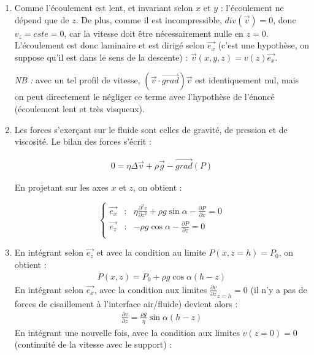 \begin{correction}

\begin{enumerate}

	\item Comme l'écoulement est lent, et invariant selon $x$ et $y$ : l'écoulement ne dépend que de $z$. De plus, comme il est incompressible, $div(\vec{v})=0$, donc $v_z=cste=0$, car la vitesse doit être nécessairement nulle en $z=0$. L'écoulement est donc laminaire et est dirigé selon $\vec{e_x}$ (c'est une hypothèse, on suppose qu'il est dans le sens de la descente) : $\vec{v}(x,y,z)=v(z)\vec{e_x}$.
	
	\textit{NB : }avec un tel profil de vitesse, $(\vec{v}\cdot\vec{grad})\vec{v}$ est identiquement nul, mais on peut directement le négliger ce terme avec l'hypothèse de l'énoncé (écoulement lent et très visqueux).
	
	\item Les forces s'exerçant sur le fluide sont celles de gravité, de pression et de viscosité. Le bilan des forces s'écrit : 

\begin{align*}
	0=\eta \Delta \vec{v}+\rho\vec{g}-\vec{grad}(P)
\end{align*}

	En projetant sur les axes $x$ et $z$, on obtient :
	
\begin{equation}
\left\lbrace
\begin{array}{ccc}
\vec{e_x}  & : & \eta\frac{\partial^2 v}{\partial z^2}+\rho g \sin\alpha - \frac{\partial P}{\partial x}=0\\
\vec{e_z}  & : &-\rho g \cos\alpha - \frac{\partial P}{\partial z}=0\\
\end{array}\right.
\end{equation}	

	\item En intégrant selon $\vec{e_z}$ et avec la condition au limite $P(x,z=h)=P_0$, on obtient :
\begin{align*}
	P(x,z)=P_0+\rho g\cos\alpha (h-z)
\end{align*}
En intégrant selon $\vec{e_x}$, avec la condition aux limites $\frac{\partial v}{\partial z}_{z=h}=0$ (il n'y a pas de forces de cisaillement à l'interface air/fluide) devient alors : 
\begin{align*}
	\frac{\partial v}{\partial z}=\frac{\rho g}{\eta}\sin\alpha(h-z)
\end{align*}
En intégrant une nouvelle fois, avec la condition aux limites $v(z=0)=0$ (continuité  de la vitesse avec le support) :


\end{enumerate}
\end{correction}
